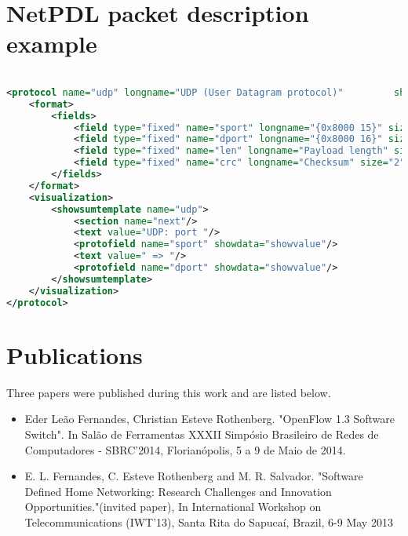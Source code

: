 \begin{anexosenv}

\partanexos

\chapter{NetPDL packet description example}
\label{annex:NetPDLdesc}

\begin{lstlisting}[frame=single,language=XML,breaklines=true, tabsize=2,showspaces=false,showstringspaces=false]  % Start your code-block

<protocol name="udp" longname="UDP (User Datagram protocol)"         showsumtemplate="udp">
	<format>
		<fields>
			<field type="fixed" name="sport" longname="{0x8000 15}" size="2" showtemplate="FieldDec"/>
			<field type="fixed" name="dport" longname="{0x8000 16}" size="2" showtemplate="FieldDec"/>
			<field type="fixed" name="len" longname="Payload length" size="2" showtemplate="FieldDec"/>
			<field type="fixed" name="crc" longname="Checksum" size="2" showtemplate="FieldHex"/>
		</fields>
	</format>
	<visualization>
		<showsumtemplate name="udp">
			<section name="next"/>
			<text value="UDP: port "/>
			<protofield name="sport" showdata="showvalue"/>
			<text value=" => "/>
			<protofield name="dport" showdata="showvalue"/>
		</showsumtemplate>
	</visualization>
</protocol>     

\end{lstlisting}

\chapter{Publications}
\label{AnnexB}
Three papers were published during this work and are listed below. 

\begin{itemize}

    \item Eder Leão Fernandes, Christian Esteve Rothenberg. "OpenFlow 1.3 Software Switch". In Salão de Ferramentas XXXII Simpósio Brasileiro de Redes de Computadores - SBRC'2014, Florianópolis, 5 a 9 de Maio de 2014.

    \item  E. L. Fernandes, C. Esteve Rothenberg and M. R. Salvador. "Software Defined Home Networking: Research Challenges and Innovation Opportunities."(invited paper), In International Workshop on Telecommunications (IWT'13), Santa Rita do Sapucaí, Brazil, 6-9 May 2013
    

\end{itemize}
\end{anexosenv}
